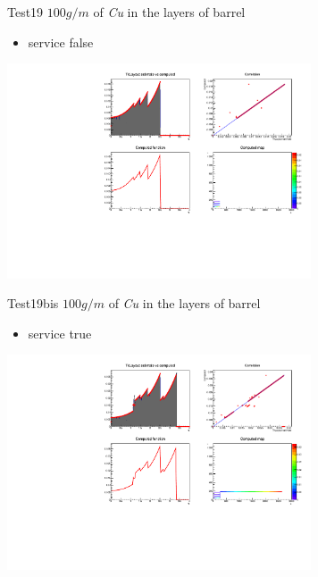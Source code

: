 \documentclass[pdftex, 11pt]{beamer}
\begin{document}
\begin{frame}
  \begin{block}{Test19}
    \alert{$100 g/m$} of \emph{Cu} in the layers of barrel
    \begin{itemize}
    \item \alert{service} false
    \end{itemize}
  \end{block}
  \begin{center}
    \includegraphics[width=9cm]{img/test19.pdf}
  \end{center}
\end{frame}

\begin{frame}
  \begin{block}{Test19bis}
    \alert{$100 g/m$} of \emph{Cu} in the layers of barrel
    \begin{itemize}
    \item \alert{service} true
    \end{itemize}
  \end{block}
  \begin{center}
    \includegraphics[width=9cm]{img/test19bis.pdf}
  \end{center}
\end{frame}
\end{document}
